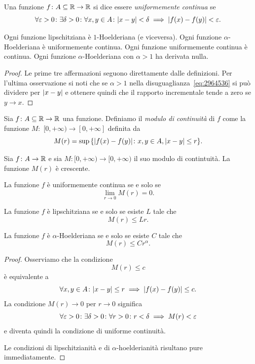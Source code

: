\begin{definition}
\mymark{**}%
Una funzione $f\colon A \subseteq {\mathbb R} \to {\mathbb R}$ si dice essere
\emph{uniformemente continua}
%
%
%
se
\[
 \forall \varepsilon>0\colon \exists \delta > 0 \colon
 \forall x,y\in A \colon {\left|x-y\right|} < \delta \implies {\left|f(x)-f(y)\right|} < \varepsilon.
\]
\end{definition}

\begin{theorem}
Ogni funzione lipschitziana è $1$-Hoelderiana (e viceversa).
Ogni funzione $\alpha$-Hoelderiana è uniformemente continua.
Ogni funzione uniformemente continua è continua.
Ogni funzione $\alpha$-Hoelderiana con $\alpha>1$ ha derivata nulla.
\end{theorem}
%
\begin{proof}
Le prime tre affermazioni seguono direttamente dalle definizioni.
Per l'ultima osservazione si noti che se $\alpha>1$ nella
disuguaglianza~\eqref{eq:2964536} si può dividere per ${\left|x-y\right|}$ e
ottenere quindi che il rapporto incrementale tende a zero se $y\to x$.
\end{proof}

\begin{definition}
Sia $f\colon A\subseteq {\mathbb R} \to{\mathbb R}$ una funzione.
Definiamo il \emph{modulo di continuità}%
%
 di $f$ come la funzione
$M\colon$ $[0,+\infty) \to [0,+\infty]$ definita da
\[
  M(r) = \sup {\left\{ {\left|f(x)-f(y)\right|}\colon x,y \in A, {\left|x-y\right|} \le r \right\}}.
\]
\end{definition}

\begin{theorem}
Sia $f\colon A\to {\mathbb R}$ e sia $M\colon [0,+\infty)\to [0,+\infty)$ il suo
modulo di contintuità.
La funzione $M(r)$ è crescente.

La funzione $f$ è uniformemente continua se e solo se
\[
  \lim_{r\to 0} M(r) = 0.
\]

La funzione $f$ è lipschitziana se e solo se esiste $L$ tale che
\[
  M(r) \le Lr.
\]

La funzione $f$ è $\alpha$-Hoelderiana se e solo se esiste $C$ tale che
\[
  M(r) \le C r^\alpha.
\]
\end{theorem}
%
\begin{proof}
Osserviamo che la condizione
\[
   M(r) \le c
\]
è equivalente a
\[
\forall x,y\in A \colon {\left|x-y\right|}\le r \implies  {\left|f(x)-f(y)\right|} \le c.
\]
La condizione $M(r)\to 0$ per $r \to 0$ significa
\[
 \forall \varepsilon>0\colon \exists \delta>0 \colon \forall r>0\colon r<\delta \implies M(r)<\varepsilon
\]
e diventa quindi la condizione di uniforme continuità.

Le condizioni di lipschitzianità e di $\alpha$-hoelderianità risultano pure immediatamente.
\end{proof}

